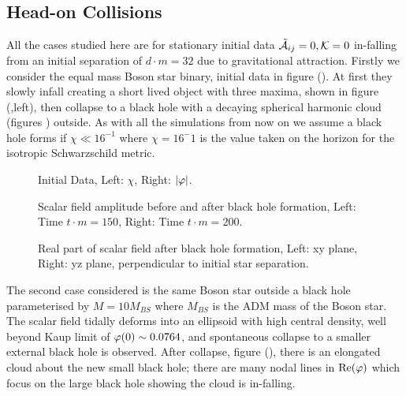 \subsection{Head-on Collisions}
All the cases studied here are for stationary initial data $\tilde{\mathcal{A}}_{ij}=0,\mathcal{K}=0$ in-falling from an initial separation of $d \cdot m = 32$ due to gravitational attraction. Firstly we consider the equal mass Boson star binary, initial data in figure (). At first they slowly infall creating a short lived object with three maxima, shown in figure (,left), then collapse to a black hole with a decaying spherical harmonic cloud (figures ) outside. As with all the simulations from now on we assume a black hole forms if $\chi \ll 16^{-1}$ where $\chi=16^-1$ is the value taken on the horizon for the isotropic Schwarzschild metric.
  \begin{figure}[H]
  \caption{Initial Data, Left: $\chi$, Right: $|\varphi|$.}
  \centering
  \hfill
\end{figure}
  \begin{figure}[H]
  \caption{Scalar field amplitude before and after black hole formation, Left: Time $t\cdot m = 150$, Right: Time $t \cdot m = 200$.}
  \centering
  \hfill
\end{figure}
   \begin{figure}[H]
  \caption{Real part of scalar field after black hole formation, Left: xy plane, Right: yz plane, perpendicular to initial star separation.}
  \centering
  \hfill
\end{figure}
 
The second case considered is the same Boson star outside a black hole parameterised by $M=10M_{BS}$ where $M_{BS}$ is the ADM mass of the Boson star. The scalar field tidally deforms into an ellipsoid with high central density, well beyond Kaup limit of $\varphi(0)\sim 0.0764$, and spontaneous collapse to a smaller external black hole is observed. After collapse, figure (), there is an elongated cloud about the new small black hole; there are many nodal lines in $\mathrm{Re}(\varphi)$ which focus on the large black hole showing the cloud is in-falling.


